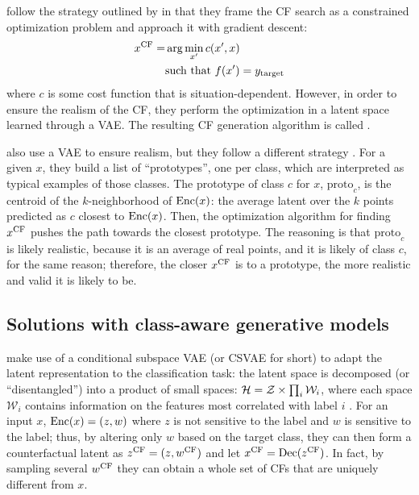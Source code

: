 \documentclass[../main.tex]{subfiles}
\begin{document}
\citeauthor{joshiRealistic2019} follow the strategy outlined by \citeauthor{wachterCounterfactual2017} in that they frame the CF search as a constrained optimization problem and approach it with gradient descent:
\begin{align*}
	x^\text{CF} = & \arg\min_{x'} c(x', x)              \\
	         & \text{such that } f(x') = y_{\mathrm{target}}
\end{align*}
where $c$ is some cost function that is situation-dependent.
However, in order to ensure the realism of the CF, they perform the optimization in a latent space learned through a VAE.
The resulting CF generation algorithm is called \revise{} \cite{joshiRealistic2019}.

\citeauthor{vanlooverenInterpretable2021} also use a VAE to ensure realism, but they follow a different strategy \cite{vanlooverenInterpretable2021}.
For a given $x$, they build a list of ``prototypes'', one per class, which are interpreted as typical examples of those classes.
The prototype of class $c$ for $x$, $\text{proto}_c$, is the centroid of the $k$-neighborhood of $\operatorname{Enc}(x)$: the average latent over the $k$ points predicted as $c$ closest to $\operatorname{Enc}(x)$.
Then, the optimization algorithm for finding $x^\text{CF}$ pushes the path towards the closest prototype.
The reasoning is that $\text{proto}_c$ is likely realistic, because it is an average of real points, and it is likely of class $c$, for the same reason; therefore, the closer $x^\text{CF}$ is to a prototype, the more realistic and valid it is likely to be.

\subsection{Solutions with class-aware generative models}

\citeauthor{downsCRUDS2020} make use of a conditional subspace VAE (or CSVAE for short) to adapt the latent representation to the classification task:
the latent space is decomposed (or ``disentangled'') into a product of small spaces: $\mathcal{H} = \mathcal{Z} \times \prod_{i} \mathcal{W}_i$, where each space $\mathcal{W}_i$ contains information on the features most correlated with label $i$ \cite{klysLearning2018}.
For an input $x$, $\operatorname{Enc}(x) = (z, w)$ where $z$ is not sensitive to the label and $w$ is sensitive to the label; thus, by altering only $w$ based on the target class, they can then form a counterfactual latent as $z^\text{CF} = (z, w^\text{CF})$ and let $x^\text{CF} = \operatorname{Dec}(z^\text{CF})$.
In fact, by sampling several $w^\text{CF}$ they can obtain a whole set of CFs that are uniquely different from $x$.
\end{document}
